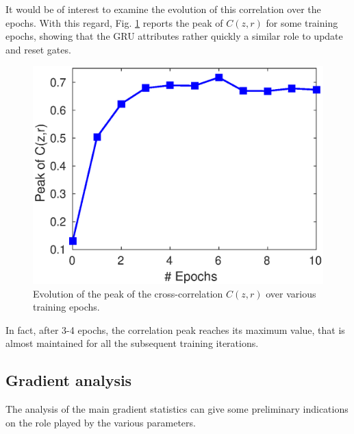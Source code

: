 \documentclass[journal]{IEEEtran}
\begin{document}
It would be of interest to examine the evolution of this correlation over the epochs. With this regard, Fig. \ref{fig:corr2} reports the peak of $C(z,r)$ for some training epochs, showing that the GRU attributes rather quickly a similar role to update and reset gates. 
\begin{figure}[t]
\centering
  \includegraphics[scale=0.50]{corr_plot2.eps}
\caption{Evolution of the  peak of the cross-correlation $C(z,r)$ over various training epochs.}\label{fig:corr2}
\end{figure}
In fact, after 3-4 epochs, the correlation peak reaches its maximum value, that is almost maintained for all the subsequent training iterations.   

\subsection{Gradient analysis} \label{sec:grad}
The analysis of the main gradient statistics can give some preliminary  indications on the role played by the various parameters. %
\end{document}

